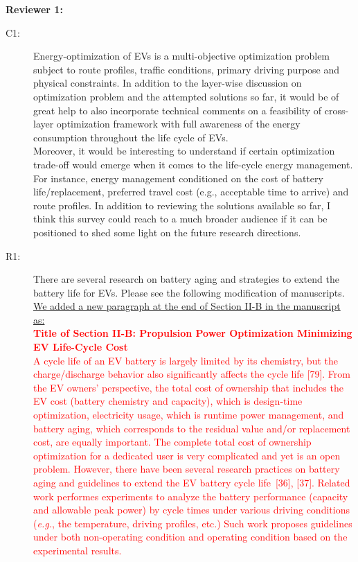 \documentclass[onecolumn]{IEEEconf}
\begin{document}
\setlength{\parindent}{0cm}
\textbf{Reviewer 1:}
\begin{description}
\item [C1: ] Energy-optimization of EVs is a multi-objective optimization problem subject to route profiles, traffic conditions, primary driving purpose and physical constraints. In addition to the layer-wise discussion on optimization problem and the attempted solutions so far, it would be of great help to also incorporate technical comments on a feasibility of cross-layer optimization framework with full awareness of the energy consumption throughout the life cycle of EVs.\\ 
Moreover, it would be interesting to understand if certain optimization trade-off would emerge when it comes to the life-cycle energy management. For instance, energy management conditioned on the cost of battery life/replacement, preferred travel cost (e.g., acceptable time to arrive) and route profiles. In addition to reviewing  the solutions available so far, I think this survey could reach to a much broader audience if it can be positioned to shed some light on the future research directions.
\item [R1: ] There are several research on battery aging and strategies to extend the battery life for EVs.  Please see the following modification of manuscripts.\\

\underline{We added a new paragraph at the end of Section II-B in the manuscript as:}\\
\textcolor{red}{
\textbf{Title of Section II-B: Propulsion Power Optimization Minimizing EV Life-Cycle Cost}\\
A cycle life of an EV battery is largely limited by its chemistry, but the charge/discharge behavior also significantly affects the cycle life [79]. From the EV owners' perspective, the total cost of ownership that includes the EV cost (battery chemistry and capacity), which is design-time optimization, electricity usage, which is runtime power management, and battery aging, which corresponds to the residual value and/or replacement cost, are equally important. The complete total cost of ownership optimization for a dedicated user is very complicated  and yet is an open problem. 
%
However, there have been several research practices on battery aging and guidelines to extend the EV battery cycle life~[36], [37]. Related work performes experiments to analyze the battery performance (capacity and allowable peak power) by cycle times under various driving conditions (\textit{e.g.}, the temperature, driving profiles, etc.) Such work proposes guidelines under both non-operating condition and operating condition based on the experimental results.}
~\\


\end{description}
\end{document}
